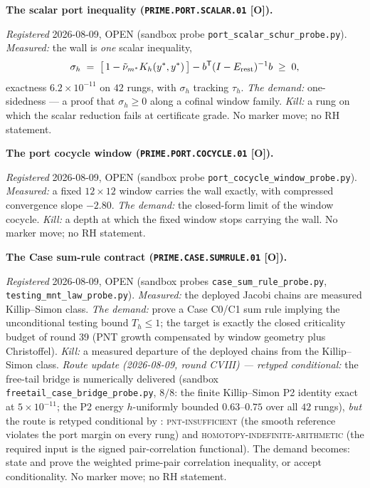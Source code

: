 \documentclass[11pt,a4paper]{article}
\begin{document}
\par\smallskip\noindent\textbf{The scalar port inequality
(\texttt{PRIME.PORT.\allowbreak SCALAR.01} [O]).}
{\sloppy
\emph{Registered} 2026-08-09, OPEN (sandbox probe
\texttt{port\_scalar\_schur\_probe.py}).  \emph{Measured:} the
wall is \emph{one} scalar inequality,
\[
\sigma_h \;=\; \big[\,1 - \tilde\nu_{m^{*}}K_h(y^{*},
y^{*})\,\big] - b^{\mathsf T}(I - E_{\rm rest})^{-1}b \;\ge\; 0,
\]
exactness $6.2\times10^{-11}$ on $42$ rungs, with $\sigma_h$
tracking $\tau_h$.  \emph{The demand:} one-sidedness --- a proof
that $\sigma_h \ge 0$ along a cofinal window family.  \emph{Kill:}
a rung on which the scalar reduction fails at certificate grade.
No marker move; no RH statement.\par}

\par\smallskip\noindent\textbf{The port cocycle window
(\texttt{PRIME.PORT.\allowbreak COCYCLE.01} [O]).}
{\sloppy
\emph{Registered} 2026-08-09, OPEN (sandbox probe
\texttt{port\_cocycle\_window\_probe.py}).  \emph{Measured:} a
fixed $12\times12$ window carries the wall exactly, with
compressed convergence slope $-2.80$.  \emph{The demand:} the
closed-form limit of the window cocycle.  \emph{Kill:} a depth at
which the fixed window stops carrying the wall.  No marker move;
no RH statement.\par}

\par\smallskip\noindent\textbf{The Case sum-rule contract
(\texttt{PRIME.CASE.\allowbreak SUMRULE.01} [O]).}
{\sloppy
\emph{Registered} 2026-08-09, OPEN (sandbox probes
\texttt{case\_sum\_rule\_probe.py},
\texttt{testing\_mnt\_law\_probe.py}).  \emph{Measured:} the
deployed Jacobi chains are measured Killip--Simon class.
\emph{The demand:} prove a Case C0/C1 sum rule implying the
unconditional testing bound $T_h \le 1$; the target is exactly
the closed criticality budget of round 39 (PNT growth compensated
by window geometry plus Christoffel).  \emph{Kill:} a measured
departure of the deployed chains from the Killip--Simon class.
\emph{Route update (2026-08-09, round CVIII) --- retyped
conditional:} the free-tail bridge is numerically delivered
(sandbox \texttt{freetail\_case\_bridge\_probe.py}, $8/8$: the
finite Killip--Simon P2 identity exact at $5\times10^{-11}$; the
P2 energy $h$-uniformly bounded $0.63$--$0.75$ over all $42$
rungs), \emph{but} the route is retyped conditional by
: \textsc{pnt-insufficient} (the
smooth reference violates the port margin on every rung) and
\textsc{homotopy-indefinite-arithmetic} (the required input is
the signed pair-correlation functional).  The demand becomes:
state and prove the weighted prime-pair correlation inequality,
or accept conditionality.  No marker move; no RH
statement.\par}
\end{document}
